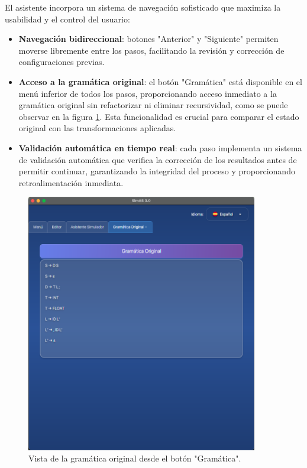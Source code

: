 El asistente incorpora un sistema de navegación sofisticado que maximiza la usabilidad y el control del usuario:

\begin{itemize}
    \item \textbf{Navegación bidireccional}: botones \string"Anterior\string" y \string"Siguiente\string" permiten moverse libremente entre los pasos, facilitando la revisión y corrección de configuraciones previas.
    \item \textbf{Acceso a la gramática original}: el botón \string"Gramática\string" está disponible en el menú inferior de todos los pasos, proporcionando acceso inmediato a la gramática original sin refactorizar ni eliminar recursividad, como se puede observar en la figura \ref{fig:gramatica_original}. Esta funcionalidad es crucial para comparar el estado original con las transformaciones aplicadas.
    \item \textbf{Validación automática en tiempo real}: cada paso implementa un sistema de validación automática que verifica la corrección de los resultados antes de permitir continuar, garantizando la integridad del proceso y proporcionando retroalimentación inmediata.
\end{itemize}

\needspace{8cm}
\begin{figure}[H]
    \centering
    \includegraphics[width=0.9\textwidth]{figuras/simulador/gramatica_original.png}
    \caption{Vista de la gramática original desde el botón \string"Gramática\string".}
    \label{fig:gramatica_original}
\end{figure}

